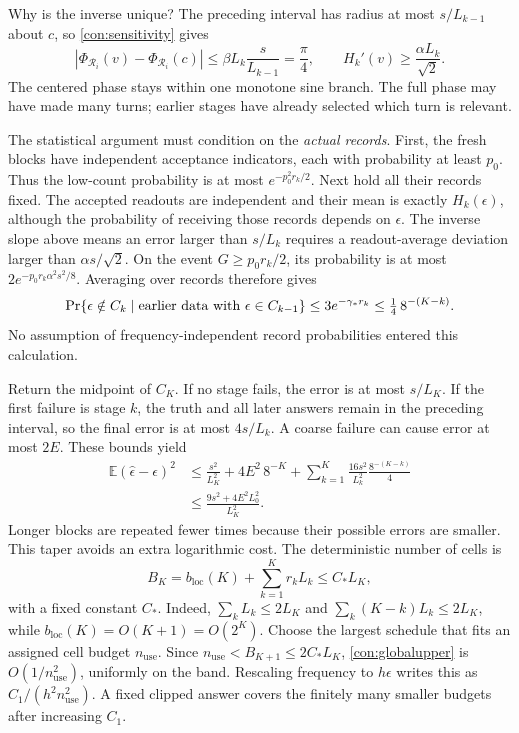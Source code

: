 \documentclass[11pt,a4paper]{article}
\numberwithin{equation}{section}
\theoremstyle{remark}
\begin{document}
Why is the inverse unique? The preceding interval has radius at most
$s/L_{k-1}$ about $c$, so \eqref{con:sensitivity} gives
\begin{equation}
 |\Phi_{\mathcal R_i}(v)-\Phi_{\mathcal R_i}(c)|
 \le\beta L_k\frac{s}{L_{k-1}}=\frac\pi4,
 \qquad H_k'(v)\ge\frac{\alpha L_k}{\sqrt2}.
\end{equation}
The centered phase stays within one monotone sine branch. The full phase
may have made many turns; earlier stages have already selected which turn
is relevant.

The statistical argument must condition on the \emph{actual records}.
First, the fresh blocks have independent acceptance indicators, each with
probability at least $p_0$. Thus the low-count probability is at most
$e^{-p_0^2r_k/2}$. Next hold all their records fixed. The accepted readouts
are independent and their mean is exactly $H_k(\epsilon)$, although the
probability of receiving those records depends on $\epsilon$.
The inverse slope above means an error larger than $s/L_k$ requires a
readout-average deviation larger than $\alpha s/\sqrt2$.
On the event $G\ge p_0r_k/2$, its probability is at most
$2e^{-p_0r_k\alpha^2s^2/8}$. Averaging over records therefore gives
\begin{equation}
 \Pr\{\epsilon\notin C_k\mid\hbox{earlier data with }\epsilon\in C_{k-1}\}
 \le3e^{-\gamma_*r_k}\le\tfrac14\,8^{-(K-k)}.
 \label{con:stagefailure}
\end{equation}
No assumption of frequency-independent record probabilities entered this
calculation.

Return the midpoint of $C_K$. If no stage fails, the error is at most
$s/L_K$. If the first failure is stage $k$, the truth and all later answers
remain in the preceding interval, so the final error is at most $4s/L_k$.
A coarse failure can cause error at most $2E$. These bounds yield
\begin{align}
 \mathbb E(\widehat\epsilon-\epsilon)^2
 &\le\frac{s^2}{L_K^2}+4E^2\,8^{-K}
       +\sum_{k=1}^K\frac{16s^2}{L_k^2}
                        \frac{8^{-(K-k)}}4\nonumber\\
 &\le\frac{9s^2+4E^2L_0^2}{L_K^2}.
 \label{con:globalupper}
\end{align}
Longer blocks are repeated fewer times because their possible errors are
smaller. This taper avoids an extra logarithmic cost. The deterministic
number of cells is
\begin{equation}
 B_K=b_{\mathrm{loc}}(K)+\sum_{k=1}^Kr_kL_k\le C_*L_K,
\end{equation}
with a fixed constant $C_*$. Indeed,
$\sum_kL_k\le2L_K$ and $\sum_k(K-k)L_k\le2L_K$, while
$b_{\mathrm{loc}}(K)=O(K+1)=O(2^K)$.
Choose the largest schedule that fits an assigned cell budget $n_{\mathrm{use}}$.
Since $n_{\mathrm{use}}<B_{K+1}\le2C_*L_K$, \eqref{con:globalupper} is
$O(1/n_{\mathrm{use}}^2)$, uniformly on the band. Rescaling frequency to $h\epsilon$
writes this as $C_1/(h^2n_{\mathrm{use}}^2)$. A fixed clipped answer covers the finitely
many smaller budgets after increasing $C_1$.
\end{document}
